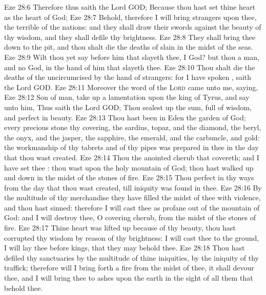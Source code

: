 \vs Eze 28:6 Therefore thus saith the Lord GOD; Because thou hast set thine heart as the heart of God;
\vs Eze 28:7 Behold, therefore I will bring strangers upon thee, the terrible of the nations: and they shall draw their swords against the beauty of thy wisdom, and they shall defile thy brightness.
\vs Eze 28:8 They shall bring thee down to the pit, and thou shalt die the deaths of  slain in the midst of the seas.
\vs Eze 28:9 Wilt thou yet say before him that slayeth thee, I  God? but thou  a man, and no God, in the hand of him that slayeth thee.
\vs Eze 28:10 Thou shalt die the deaths of the uncircumcised by the hand of strangers: for I have spoken , saith the Lord GOD.
\vs Eze 28:11 Moreover the word of the \textsc{Lord} came unto me, saying,
\vs Eze 28:12 Son of man, take up a lamentation upon the king of Tyrus, and say unto him, Thus saith the Lord GOD; Thou sealest up the sum, full of wisdom, and perfect in beauty.
\vs Eze 28:13 Thou hast been in Eden the garden of God; every precious stone  thy covering, the sardius, topaz, and the diamond, the beryl, the onyx, and the jasper, the sapphire, the emerald, and the carbuncle, and gold: the workmanship of thy tabrets and of thy pipes was prepared in thee in the day that thou wast created.
\vs Eze 28:14 Thou  the anointed cherub that covereth; and I have set thee : thou wast upon the holy mountain of God; thou hast walked up and down in the midst of the stones of fire.
\vs Eze 28:15 Thou  perfect in thy ways from the day that thou wast created, till iniquity was found in thee.
\vs Eze 28:16 By the multitude of thy merchandise they have filled the midst of thee with violence, and thou hast sinned: therefore I will cast thee as profane out of the mountain of God: and I will destroy thee, O covering cherub, from the midst of the stones of fire.
\vs Eze 28:17 Thine heart was lifted up because of thy beauty, thou hast corrupted thy wisdom by reason of thy brightness: I will cast thee to the ground, I will lay thee before kings, that they may behold thee.
\vs Eze 28:18 Thou hast defiled thy sanctuaries by the multitude of thine iniquities, by the iniquity of thy traffick; therefore will I bring forth a fire from the midst of thee, it shall devour thee, and I will bring thee to ashes upon the earth in the sight of all them that behold thee.
